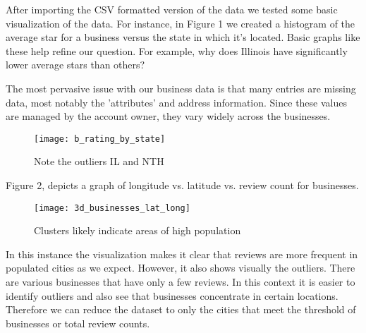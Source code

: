 \quad After importing the CSV formatted version of the data we tested some basic visualization of the data. For instance, in Figure 1 we created a histogram of the average star for a business versus the state in which it's located. Basic graphs like these help refine our question. For example, why does Illinois have significantly lower average stars than others? 

\quad The most pervasive issue with our business data is that many entries are missing data, most notably the 'attributes' and address information. Since these values are managed by the account owner, they vary widely across the businesses.

\begin{figure}[h]
\texttt{[image: b\_rating\_by\_state]}
\label{fig:Average star rating by state}
\caption{Note the outliers IL and NTH}
\end{figure}

Figure 2, depicts a graph of longitude vs. latitude vs. review count for businesses. 

\begin{figure}[!h]
\texttt{[image: 3d\_businesses\_lat\_long]}
\caption{Clusters likely indicate areas of high population}
\label{fig:Review count by latitude and longitude}
\end{figure}

\quad In this instance the visualization makes it clear that reviews are more frequent in populated cities as we expect. However, it also shows visually the outliers. There are various businesses that have only a few reviews. In this context it is easier to identify outliers and also see that businesses concentrate in certain locations. Therefore we can reduce the dataset to only the cities that meet the threshold of businesses or total review counts.

